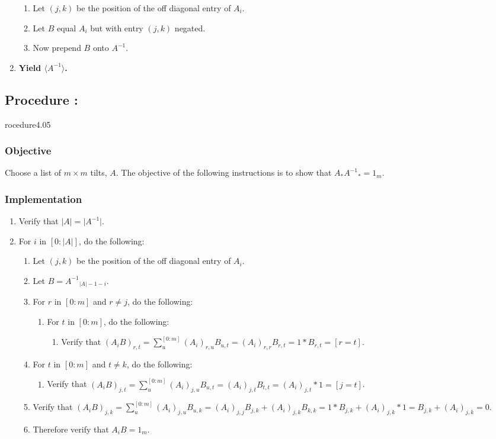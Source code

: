 \documentclass{article}
\newcounter{procedure}[part]
\newcommand{\procedure}[1]{\subsection*{Procedure \thepart:\theprocedure}\label{sec:procedure #1}\global\expandafter\edef\csname procedure#1\endcsname{\thepart:\theprocedure}\addtocounter{procedure}{1}}
\newcommand{\objective}{\subsubsection*{Objective}}
\newcommand{\implementation}{\subsubsection*{Implementation}}
\begin{document}
\begin{multicols}{2}
\begin{enumerate}
				\begin{enumerate}
					\item Let $(j,k)$ be the position of the off diagonal entry of $A_i$.
					\item Let $B$ equal $A_i$ but with entry $(j,k)$ negated.
					\item Now prepend $B$ onto $A^{-1}$.
				\end{enumerate}
				\item \textbf{Yield $\langle A^{-1}\rangle$.}
			\end{enumerate}
		\procedure{4.05}
			\objective
				Choose a list of $m\times m$ tilts, $A$. The objective of the following instructions is to show that $A_*{A^{-1}}_*=1_m$.
			\implementation
				\begin{enumerate}
					\item Verify that $\lvert A\rvert=\lvert A^{-1}\rvert$.
					\item For $i$ in $[0:\lvert A\rvert]$, do the following:
					\begin{enumerate}
						\item Let $(j,k)$ be the position of the off diagonal entry of $A_i$.
						\item Let $B={A^{-1}}_{\lvert A\rvert-1-i}$.
						\item For $r$ in $[0:m]$ and $r\ne j$, do the following:
						\begin{enumerate}
							\item For $t$ in $[0:m]$, do the following:
							\begin{enumerate}
								\item Verify that $(A_iB)_{r,t}=\sum_u^{[0:m]} (A_i)_{r,u}B_{u,t}=(A_i)_{r,r}B_{r,t}=1*B_{r,t}=[r=t]$.
							\end{enumerate}
						\end{enumerate}
						\item For $t$ in $[0:m]$ and $t\ne k$, do the following:
						\begin{enumerate}
							\item Verify that $(A_iB)_{j,t}=\sum_u^{[0:m]} (A_i)_{j,u}B_{u,t}=(A_i)_{j,t}B_{t,t}=(A_i)_{j,t}*1=[j=t]$.
						\end{enumerate}
						\item Verify that $(A_iB)_{j,k}=\sum_u^{[0:m]} (A_i)_{j,u}B_{u,k}=(A_i)_{j,j}B_{j,k}+(A_i)_{j,k}B_{k,k}=1*B_{j,k}+(A_i)_{j,k}*1=B_{j,k}+(A_i)_{j,k}=0$.
						\item Therefore verify that $A_iB=1_m$.
					\end{enumerate}

\end{enumerate}
\end{multicols}
\end{document}
